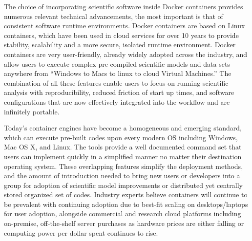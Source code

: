 \documentclass[draft]{ametsoc}
\begin{document}
The choice of incorporating scientific software inside Docker containers provides numerous relevant technical advancements, the most important is that of consistent software runtime environments.  
Docker containers are based on Linux containers, which have been used in cloud services for over 10 years to provide stability, scalability and a more secure, isolated runtime environment. Docker containers are very user-friendly, already widely adopted across the industry, and allow users to execute complex pre-compiled scientific models and data sets anywhere from ``Windows to Macs to linux to cloud Virtual Machines.'' The combination of all these features enable users to focus on running scientific analysis with reproducibility, reduced friction of start up times, and software configurations that are now effectively integrated into the workflow and are infinitely portable.

Today's container engines have become a homogeneous and emerging standard, which can execute pre-built codes upon every modern OS including Windows, Mac OS X, and Linux.  The tools provide a well documented command set that users can implement quickly in a simplified manner no matter their destination operating system.  These overlapping features simplify the deployment methods, and the amount of introduction needed to bring new users or developers into a group for adoption of scientific model improvements or distributed yet centrally stored organized set of codes.  Industry experts believe containers will continue to be prevalent with continuing adoption due to best-fit scaling on desktops/laptops for user adoption, alongside commercial and research cloud platforms including on-premise, off-the-shelf server purchases as hardware prices are either falling or computing power per dollar spent continues to rise. 
\end{document}
